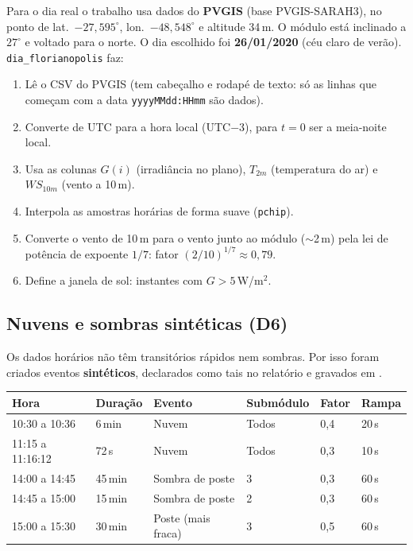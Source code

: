 Para o dia real o trabalho usa dados do \textbf{PVGIS} (base PVGIS-SARAH3), no ponto de lat.\ $-27{,}595^\circ$, lon.\ $-48{,}548^\circ$ e altitude 34\,m. O m\'odulo est\'a inclinado a $27^\circ$ e
voltado para o norte. O dia escolhido foi \textbf{26/01/2020} (c\'eu claro de ver\~ao). \texttt{dia\_florianopolis} faz:

\begin{enumerate}
\item L\^e o CSV do PVGIS (tem cabe\c{c}alho e rodap\'e de texto: s\'o as linhas que come\c{c}am com a data \texttt{yyyyMMdd:HHmm} s\~ao dados).
\item Converte de UTC para a hora local (UTC$-3$), para $t=0$ ser a meia-noite local.
\item Usa as colunas $G(i)$ (irradi\^ancia no plano), $T_{2m}$ (temperatura do ar) e $WS_{10m}$ (vento a 10\,m).
\item Interpola as amostras hor\'arias de forma suave (\texttt{pchip}).
\item Converte o vento de 10\,m para o vento junto ao m\'odulo ($\sim$2\,m) pela lei de pot\^encia de expoente $1/7$: fator $(2/10)^{1/7}\approx0{,}79$.
\item Define a janela de sol: instantes com $G>5$\,W/m$^2$.
\end{enumerate}

\subsection{Nuvens e sombras sint\'eticas (D6)}

Os dados hor\'arios n\~ao t\^em transit\'orios r\'apidos nem sombras. Por isso foram criados eventos \textbf{sint\'eticos}, declarados como tais no relat\'orio e gravados em .

\begin{center}\small
\begin{tabular}{@{}llllll@{}}
\toprule
Hora & Dura\c{c}\~ao & Evento & Subm\'odulo & Fator & Rampa \\ \midrule
10:30 a 10:36 & 6\,min & Nuvem & Todos & 0,4 & 20\,s \\
11:15 a 11:16:12 & 72\,s & Nuvem & Todos & 0,3 & 10\,s \\
14:00 a 14:45 & 45\,min & Sombra de poste & 3 & 0,3 & 60\,s \\
14:45 a 15:00 & 15\,min & Sombra de poste & 2 & 0,3 & 60\,s \\
15:00 a 15:30 & 30\,min & Poste (mais fraca) & 3 & 0,5 & 60\,s \\
\bottomrule
\end{tabular}
\end{center}


